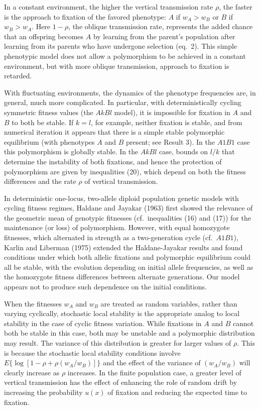 In a constant environment, the higher the vertical transmission rate $\rho$, the faster is the approach to fixation of the favored phenotype: $A$ if $w_A>w_B$ or $B$ if $w_B>w_A$. Here $1-\rho$, the oblique transmission rate, represents the added chance that an offspring becomes $A$ by learning from the parent's population after learning from its parents who have undergone selection (eq.\ 2). This simple phenotypic model does not allow a polymorphism to be achieved in a constant environment, but with more oblique transmission, approach to fixation is retarded.

 With fluctuating environments, the dynamics of the phenotype frequencies are, in general, much more complicated. In particular, with deterministically cycling symmetric fitness values (the $AkBl$ model), it is impossible for fixation in $A$ and $B$ to both be stable. If $k=l$, for example, neither fixation is stable, and from numerical iteration it appears that there is a simple stable polymorphic equilibrium (with phenotypes $A$ and $B$ present; see Result 3). In the $A1B1$ case this  polymorphism is globally stable. In the $AkBl$ case, bounds on $l/k$ that determine the instability of both fixations, and hence the protection of polymorphism are given by inequalities (20), which depend on both the fitness differences and the rate $\rho$ of vertical transmission.
 
 In deterministic one-locus, two-allele diploid population genetic models with cycling fitness regimes, Haldane and Jayakar (1963) first showed the relevance of the geometric mean of genotypic fitnesses (cf.\ inequalities (16) and (17)) for the maintenance (or loss) of polymorphism. However, with equal homozygote fitnesses, which alternated in strength as a two-generation cycle (cf.\ $A1B1$), Karlin and Liberman (1975) extended the Haldane-Jayakar results and found conditions under which both allelic fixations and polymorphic equilibrium could all be stable, with the evolution depending on initial allele frequencies, as well as the homozygote fitness differences between alternate generations. Our model appears not to produce such dependence on the initial conditions.
 
 When the fitnesses $w_A$ and $w_B$ are treated as random variables, rather than varying cyclically, stochastic local stability is the appropriate analog to local stability in the case of cyclic fitness variation. While fixations in $A$ and $B$ cannot both be stable in this case, both may be unstable and a polymorphic distribution may result. The variance of this distribution is greater for larger values of $\rho$. This is because the  stochastic local stability conditions involve $E\bigl\{\log[1-\rho+\rho(w_A/w_B)]\bigr\}$ and the effect of the variance of $(w_A/w_B)$ will clearly increase as $\rho$ increases. In the finite population case, a greater level of vertical transmission has the effect of enhancing the role of random drift by increasing the probability $u(x)$ of fixation and reducing the expected time to fixation.
 
